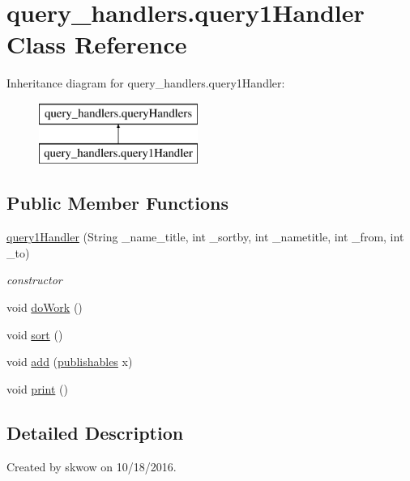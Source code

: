 \hypertarget{classquery__handlers_1_1query1_handler}{}\section{query\+\_\+handlers.\+query1\+Handler Class Reference}
\label{classquery__handlers_1_1query1_handler}
Inheritance diagram for query\+\_\+handlers.\+query1\+Handler\+:\begin{figure}[H]
\begin{center}
\leavevmode
\includegraphics[height=2.000000cm]{classquery__handlers_1_1query1_handler}
\end{center}
\end{figure}
\subsection*{Public Member Functions}
\begin{DoxyCompactItemize}
\item 
\hyperlink{classquery__handlers_1_1query1_handler_a6fe01c044940a164a6c56149fd031131}{query1\+Handler} (String \+\_\+name\+\_\+title, int \+\_\+sortby, int \+\_\+nametitle, int \+\_\+from, int \+\_\+to)
\begin{DoxyCompactList}\small\item\em constructor \end{DoxyCompactList}\item 
void \hyperlink{classquery__handlers_1_1query1_handler_a6e9b752a4ad27626e66dd07bd45661df}{do\+Work} ()
\item 
void \hyperlink{classquery__handlers_1_1query1_handler_ad31be63c673088813821cb1150c8506e}{sort} ()
\item 
void \hyperlink{classquery__handlers_1_1query1_handler_a139b0b15be5b2a7ac0b58a70906fb2a0}{add} (\hyperlink{class_data_1_1publishables}{publishables} x)
\item 
void \hyperlink{classquery__handlers_1_1query1_handler_adb0e49911128d6a1e710cace36a4fae0}{print} ()
\end{DoxyCompactItemize}


\subsection{Detailed Description}
Created by skwow on 10/18/2016. 

